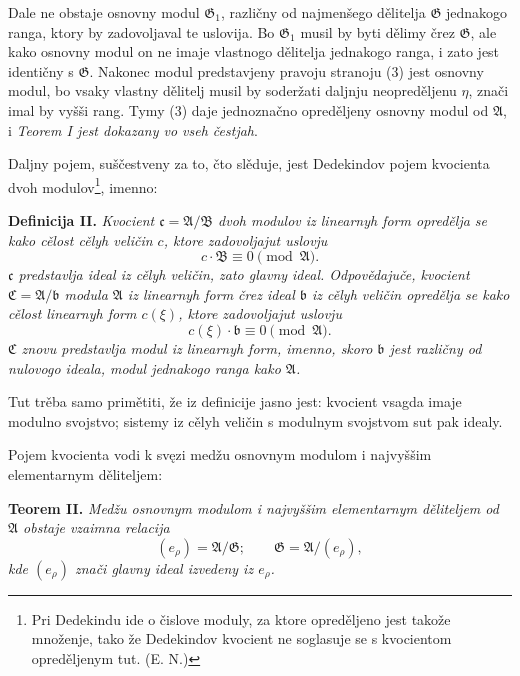 \documentclass[11pt]{article}
\providecommand{\Amod}{\mathfrak A}
\providecommand{\Bmod}{\mathfrak B}
\providecommand{\Gmod}{\mathfrak G}
\providecommand{\bb}{\mathfrak b}
\providecommand{\cc}{\mathfrak c}
\providecommand{\zero}[1]{\equiv 0\pmod{#1}}
\begin{document}
Dale ne obstaje osnovny modul $\Gmod_1$, različny od najmenšego dělitelja $\Gmod$ jednakogo ranga, ktory by zadovoljaval te uslovija. Bo $\Gmod_1$ musil by byti dělimy črez $\Gmod$, ale kako osnovny modul on ne imaje vlastnogo dělitelja jednakogo ranga, i zato jest identičny s $\Gmod$. Nakonec modul predstavjeny pravoju stranoju (3) jest osnovny modul, bo vsaky vlastny dělitelj musil by soderžati daljnju neopreděljenu $\eta$, znači imal by vyšši rang. Tymy (3) daje jednoznačno opreděljeny osnovny modul od $\Amod$, i \emph{Teorem I jest dokazany vo vseh čestjah}.

Daljny pojem, suščestveny za to, čto slěduje, jest Dedekindov pojem kvocienta dvoh modulov\footnote{Pri Dedekindu ide o čislove moduly, za ktore opreděljeno jest takože množenje, tako že Dedekindov kvocient ne soglasuje se s kvocientom opreděljenym tut. (E. N.)}, imenno:

\medskip
\noindent\textbf{Definicija II.} \emph{Kvocient $\cc=\Amod/\Bmod$ dvoh modulov iz linearnyh form opredělja se kako cělost cělyh veličin $c$, ktore zadovoljajut uslovju}
\[
 c\cdot\Bmod\zero{\Amod}.
\]
\emph{$\cc$ predstavlja ideal iz cělyh veličin, zato glavny ideal. Odpovědajuče, kvocient $\mathfrak C=\Amod/\bb$ modula $\Amod$ iz linearnyh form črez ideal $\bb$ iz cělyh veličin opredělja se kako cělost linearnyh form $c(\xi)$, ktore zadovoljajut uslovju}
\[
 c(\xi)\cdot\bb\zero{\Amod}.
\]
\emph{$\mathfrak C$ znovu predstavlja modul iz linearnyh form, imenno, skoro $\bb$ jest različny od nulovogo ideala, modul jednakogo ranga kako $\Amod$.}

Tut trěba samo primětiti, že iz definicije jasno jest: kvocient vsagda imaje modulno svojstvo; sistemy iz cělyh veličin s modulnym svojstvom sut pak idealy.

Pojem kvocienta vodi k svęzi medžu osnovnym modulom i najvyššim elementarnym děliteljem:

\medskip
\noindent\textbf{Teorem II.} \emph{Medžu osnovnym modulom i najvyššim elementarnym děliteljem od $\Amod$ obstaje vzaimna relacija}
\begin{equation}
 (e_\rho)=\Amod/\Gmod;\qquad \Gmod=\Amod/(e_\rho),
\tag{5}
\end{equation}
\emph{kde $(e_\rho)$ znači glavny ideal izvedeny iz $e_\rho$.}
\end{document}
